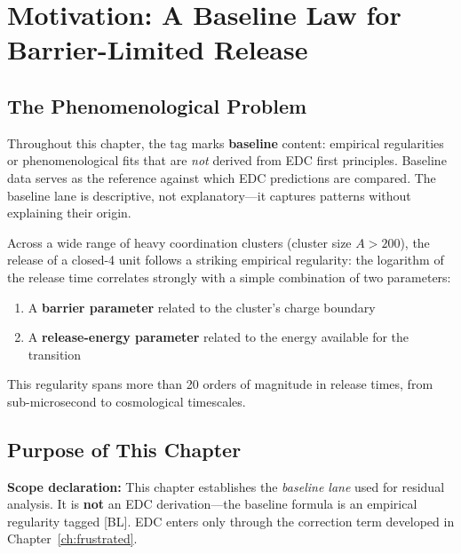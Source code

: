 \section{Motivation: A Baseline Law for Barrier-Limited Release}
\label{sec:gn:motivation}

\subsection{The Phenomenological Problem}

\begin{tcolorbox}[colback=gray!5,colframe=gray!50!black,title=Epistemic Tag: {[BL]} Baseline]
Throughout this chapter, the tag \tagBL{} marks \textbf{baseline} content:
empirical regularities or phenomenological fits that are \emph{not} derived
from EDC first principles. Baseline data serves as the reference against
which EDC predictions are compared. The baseline lane is descriptive, not
explanatory---it captures patterns without explaining their origin.
\end{tcolorbox}

Across a wide range of heavy coordination clusters (cluster size $A > 200$),
the release of a closed-4 unit follows a striking empirical regularity:
the logarithm of the release time correlates strongly with a simple combination
of two parameters:

\begin{enumerate}
    \item A \textbf{barrier parameter} related to the cluster's charge boundary
    \item A \textbf{release-energy parameter} related to the energy available
          for the transition
\end{enumerate}

This regularity spans more than 20 orders of magnitude in release times,
from sub-microsecond to cosmological timescales. \tagBL

\subsection{Purpose of This Chapter}

\begin{resultbox}
    \textbf{Scope declaration:} This chapter establishes the \emph{baseline lane}
    used for residual analysis. It is \textbf{not} an EDC derivation---the baseline
    formula is an empirical regularity tagged [BL]. EDC enters only through
    the correction term developed in Chapter~\ref{ch:frustrated}.
    \tagBL
\end{resultbox}

